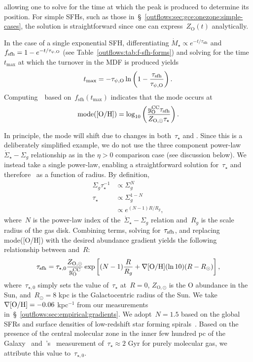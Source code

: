 allowing one to solve for the time at which the peak is produced to determine
its position.
For simple SFHs, such as those in~\S~\ref{outflows:sec:gce:onezone:simple-cases},
the solution is straightforward since one can express~$Z_\text{O}(t)$
analytically.
\par
In the case of a single exponential SFH, differentiating
$\dot{M}_\star \propto e^{-t / \tau_\text{sfh}}$ and
$f_\text{sfh} = 1 - e^{-t / \tau_{\psi,\text{O}}}$ (see
Table~\ref{outflows:tab:f-sfh-forms}) and solving for the time~$t_\text{max}$
at which the turnover in the MDF is produced yields
\begin{equation}
t_\text{max} = -\tau_{\psi,\text{O}} \ln \left(1 - \frac{\tau_\text{sfh}}{\tau_{\psi,\text{O}}}
\right).
\end{equation}
Computing~\oh~based on~$f_\text{sfh}(t_\text{max})$ indicates that the mode
occurs at
\begin{equation}
\text{mode([O/H])} = \log_{10}
\left(\frac{y_\text{O}^\text{CC} \tau_\text{sfh}}{Z_{\text{O},\odot} \tau_\star}\right).
\end{equation}
\par
In principle, the mode will shift due to changes in both~$\tau_\star$ and
.
Since this is a deliberately simplified example, we do not use the three
component power-law~$\dot{\Sigma}_\star - \Sigma_g$ relationship as in the
$\eta > 0$ comparison case (see discussion below).
We instead take a single power-law, enabling a straightforward solution
for~$\tau_\star$ and therefore~ as a function of radius.
By definition,
\begin{equation}
\begin{split}
\Sigma_g \tau_\star^{-1} &\propto \Sigma_g^N
\\
\tau_\star & \propto \Sigma_g^{1 - N}
\\
& \propto e^{(N - 1) R / R_g},
\end{split}
\end{equation}
where~$N$ is the power-law index of the~$\dot{\Sigma}_\star - \Sigma_g$
relation and~$R_g$ is the scale radius of the gas disk.
Combining terms, solving for~$\tau_\text{sfh}$, and replacing mode([O/H]) with
the desired abundance gradient yields the following relationship between
 and~$R$:
\begin{equation}
\tau_\text{sfh} = \tau_{\star,0} \frac{Z_{\text{O},\odot}}{y_\text{O}^\text{CC}}
\exp\left[
(N - 1)\frac{R}{R_g} + \nabla\text{[O/H]}(\ln 10)(R - R_\odot)
\right],
\end{equation}
where~$\tau_{\star,0}$ simply sets the value of~$\tau_\star$ at~$R = 0$,
$Z_{\text{O},\odot}$ is the O abundance in the Sun, and~$R_\odot = 8$ kpc is
the Galactocentric radius of the Sun.
We take~$\nabla\text{[O/H]} = -0.06$ kpc$^{-1}$ from our measurements
in~\S~\ref{outflows:sec:empirical:gradients}.
We adopt~$N = 1.5$ based on the global SFRs and surface densities of
low-redshift star forming spirals~\citep{Kennicutt1998}.
Based on the presence of the central molecular zone in the inner few hundred
pc of the Galaxy~\citep[e.g.,][]{Morris1996, Dahmen1998, PiercePrice2000,
Hatchfield2020} and~\citeauthor{Leroy2008}'s~\citeyearpar{Leroy2008}
measurement of~$\tau_\star \approx 2$ Gyr for purely molecular gas, we
attribute this value to~$\tau_{\star,0}$.



